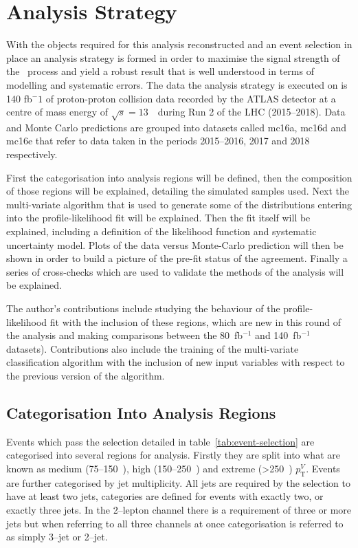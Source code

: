 \chapter{Analysis Strategy}%
\label{ch:strategy}

With the objects required for this analysis reconstructed and an event selection
in place an analysis strategy is formed in order to maximise the signal strength
of the \VHbb\ process and yield a robust result that is well understood in terms
of modelling and systematic errors. The data the analysis strategy is executed
on is 140 fb${^-1}$ of proton-proton collision data recorded by the ATLAS
detector at a centre of mass energy of $\sqrt{s} = 13$~\TeV\ during Run 2 of the
LHC (2015--2018). Data and Monte Carlo predictions are grouped into datasets
called mc16a, mc16d and mc16e that refer to data taken in the periods
2015--2016, 2017 and 2018 respectively.

First the categorisation into analysis regions will be defined, then the
composition of those regions will be explained, detailing the simulated samples
used. Next the multi-variate algorithm that is used to generate some of the
distributions entering into the profile-likelihood fit will be explained. Then
the fit itself will be explained, including a definition of the likelihood
function and systematic uncertainty model. Plots of the data versus Monte-Carlo
prediction will then be shown in order to build a picture of the pre-fit status
of the agreement. Finally a series of cross-checks which are used to validate
the methods of the analysis will be explained.

The author's contributions include studying the behaviour of the
profile-likelihood fit with the inclusion of these regions, which are new in
this round of the analysis and making comparisons between the 80~fb$^{-1}$ and
140~fb$^{-1}$ datasets). Contributions also include the training of the
multi-variate classification algorithm with the inclusion of new input variables
with respect to the previous version of the algorithm.

\section{Categorisation Into Analysis Regions}
\label{sec:ana-regions}

Events which pass the selection detailed in table~\ref{tab:event-selection} are
categorised into several regions for analysis. Firstly they are split into what
are known as medium (75--150~\GeV), high (150--250~\GeV) and extreme (>250~\GeV)
$p_{\mathrm{T}}^{V}$. Events are further categorised by jet multiplicity. All
jets are required by the selection to have at least two jets, categories are
defined for events with exactly two, or exactly three jets. In the 2--lepton
channel there is a requirement of three or more jets but when referring to all
three channels at once categorisation is referred to as simply 3--jet or 2--jet.

